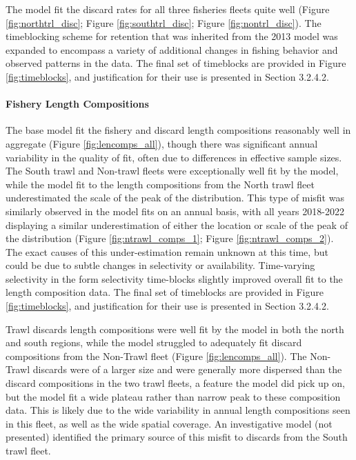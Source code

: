 \documentclass[11pt,
  english,
  letterpaper,
]{article}
\begin{document}
The model fit the discard rates for all three fisheries fleets quite well (Figure \ref{fig:northtrl_disc}; Figure \ref{fig:southtrl_disc}; Figure \ref{fig:nontrl_disc}). The timeblocking scheme for retention that was inherited from the 2013 model was expanded to encompass a variety of additional changes in fishing behavior and observed patterns in the data. The final set of timeblocks are provided in Figure \ref{fig:timeblocks}, and justification for their use is presented in Section 3.2.4.2.

\hypertarget{fishery-length-compositions-1}{%
\paragraph{Fishery Length Compositions}\label{fishery-length-compositions-1}}

The base model fit the fishery and discard length compositions reasonably well in aggregate (Figure \ref{fig:lencomps_all}), though there was significant annual variability in the quality of fit, often due to differences in effective sample sizes. The South trawl and Non-trawl fleets were exceptionally well fit by the model, while the model fit to the length compositions from the North trawl fleet underestimated the scale of the peak of the distribution. This type of misfit was similarly observed in the model fits on an annual basis, with all years 2018-2022 displaying a similar underestimation of either the location or scale of the peak of the distribution (Figure \ref{fig:ntrawl_comps_1}; Figure \ref{fig:ntrawl_comps_2}). The exact causes of this under-estimation remain unknown at this time, but could be due to subtle changes in selectivity or availability. Time-varying selectivity in the form selectivity time-blocks slightly improved overall fit to the length composition data. The final set of timeblocks are provided in Figure \ref{fig:timeblocks}, and justification for their use is presented in Section 3.2.4.2.

Trawl discards length compositions were well fit by the model in both the north and south regions, while the model struggled to adequately fit discard compositions from the Non-Trawl fleet (Figure \ref{fig:lencomps_all}). The Non-Trawl discards were of a larger size and were generally more dispersed than the discard compositions in the two trawl fleets, a feature the model did pick up on, but the model fit a wide plateau rather than narrow peak to these composition data. This is likely due to the wide variability in annual length compositions seen in this fleet, as well as the wide spatial coverage. An investigative model (not presented) identified the primary source of this misfit to discards from the South trawl fleet.
\end{document}
